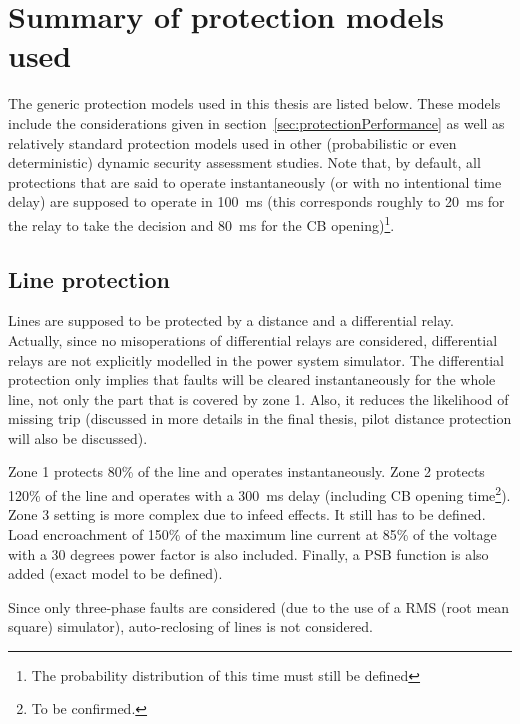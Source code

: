 
\section{Summary of protection models used}
\label{sec:consideredProtections}

The generic protection models used in this thesis are listed below. These models include the considerations given in section~\ref{sec:protectionPerformance} as well as relatively standard protection models used in other (probabilistic or even deterministic) dynamic security assessment studies. Note that, by default, all protections that are said to operate instantaneously (or with no intentional time delay) are supposed to operate in 100~ms (this corresponds roughly to 20~ms for the relay to take the decision and 80~ms for the CB opening)\footnote{The probability distribution of this time must still be defined}.

\subsection{Line protection}

Lines are supposed to be protected by a distance and a differential relay. Actually, since no misoperations of differential relays are considered, differential relays are not explicitly modelled in the power system simulator. The differential protection only implies that faults will be cleared instantaneously for the whole line, not only the part that is covered by zone 1. Also, it reduces the likelihood of missing trip (discussed in more details in the final thesis, pilot distance protection will also be discussed).

Zone 1 protects 80\% of the line and operates instantaneously. Zone 2 protects 120\% of the line and operates with a 300~ms delay (including CB opening time\footnote{To be confirmed.}). Zone 3 setting is more complex due to infeed effects. It still has to be defined. Load encroachment of 150\% of the maximum line current at 85\% of the voltage with a 30 degrees power factor is also included. Finally, a PSB function is also added (exact model to be defined).

Since only three-phase faults are considered (due to the use of a RMS (root mean square) simulator), auto-reclosing of lines is not considered.



